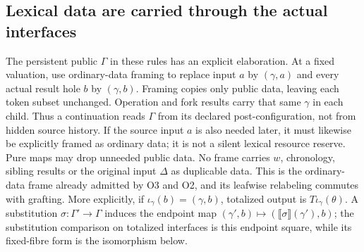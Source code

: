 \documentclass[11pt,a4paper]{article}
\theoremstyle{definition}
\newcommand{\den}[1]{\llbracket #1\rrbracket}
\begin{document}
\subsection{Lexical data are carried through the actual interfaces}
The persistent public $\Gamma$ in these rules has an explicit elaboration.
At a fixed valuation, use ordinary-data framing to replace input $a$ by
$(\gamma,a)$ and every actual result hole $b$ by $(\gamma,b)$. Framing
copies only public data, leaving each token subset unchanged. Operation
and fork results carry that same $\gamma$ in each child. Thus a continuation
reads $\Gamma$ from its declared post-configuration, not from hidden source
history. If the source input $a$ is also needed later, it must likewise be
explicitly framed as ordinary data; it is not a silent lexical resource
reserve. Pure maps may drop unneeded public data. No frame carries $w$,
chronology, sibling results or the original input $\Delta$ as duplicable data.
This is the ordinary-data frame already admitted by O3 and O2, and its
leafwise relabeling commutes with grafting. More explicitly, if
$\iota_\gamma(b)=(\gamma,b)$, totalized output is
$T\iota_\gamma(\theta)$. A substitution $\sigma:\Gamma'\to\Gamma$
induces the endpoint map $(\gamma',b)\mapsto(\den\sigma(\gamma'),b)$;
the substitution comparison on totalized interfaces is this endpoint
square, while its fixed-fibre form is the isomorphism below.
\end{document}
